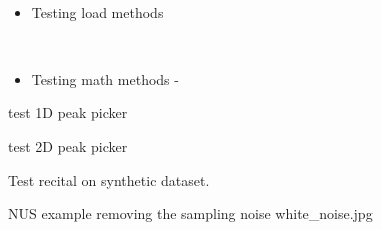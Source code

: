 \documentclass[letterpaper,10pt,openany,oneside]{sphinxmanual}
\begin{document}
\begin{fulllineitems}
\begin{fulllineitems}
\end{fulllineitems}


\begin{fulllineitems}
\label{rst/code:NPKData.NPKDataTests.test_load}~\begin{itemize}
\item {} 
Testing load methods

\end{itemize}

\end{fulllineitems}


\begin{fulllineitems}
\label{rst/code:NPKData.NPKDataTests.test_math}~\begin{itemize}
\item {} 
Testing math methods -

\end{itemize}

\end{fulllineitems}


\begin{fulllineitems}
\label{rst/code:NPKData.NPKDataTests.test_peaks1d}
test 1D peak picker

\end{fulllineitems}


\begin{fulllineitems}
\label{rst/code:NPKData.NPKDataTests.test_peaks2d}
test 2D peak picker

\end{fulllineitems}


\begin{fulllineitems}
\label{rst/code:NPKData.NPKDataTests.test_recital_synthetic}
Test recital on synthetic dataset.

\end{fulllineitems}


\begin{fulllineitems}
\label{rst/code:NPKData.NPKDataTests.test_superresolution}
NUS example
removing the sampling noise white\_noise.jpg

\end{fulllineitems}


\end{fulllineitems}
\end{document}
